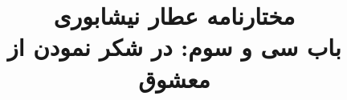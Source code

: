\documentclass[14pt,b5paper]{article}
\begin{document}
\title{\Huge مختارنامه عطار نیشابوری \\
باب سی و سوم: در شکر نمودن از معشوق}
\author{ }
\date{ }
\maketitle
\newpage
\tableofcontents
\newpage

\newpage

\newpage

\newpage

\newpage

\newpage

\newpage

\newpage

\newpage

\newpage

\newpage

\newpage

\newpage

\newpage

\newpage

\newpage

\newpage

\newpage

\newpage

\newpage

\newpage

\newpage

\newpage

\newpage

\newpage

\newpage

\newpage

\newpage

\newpage

\newpage

\newpage

\newpage

\newpage

\newpage

\newpage

\newpage

\newpage

\newpage

\newpage

\newpage

\newpage

\newpage

\newpage

\newpage

\newpage

\newpage

\newpage

\newpage

\newpage

\newpage

\newpage
\end{document}

